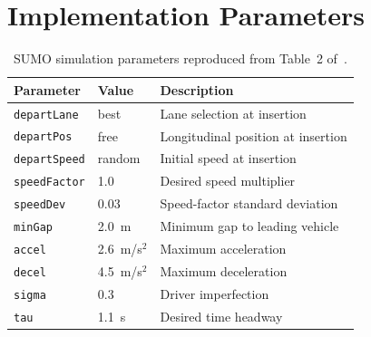 \documentclass{rescience}
\begin{document}




\hypersetup{linkcolor=black,urlcolor=darkgray}
\renewcommand\emph[1]{{\bfseries #1}}
\setlength\bibitemsep{0pt}
\printbibliography


\newpage
\appendix

\section{Implementation Parameters}
\label{sec:implementation_parameters}

\begin{table}[!h]
\centering
\caption{SUMO simulation parameters reproduced from Table~2 of~\cite{Yang2025Reinforcement}.}
\label{tab:sumo_params}
\begin{tabular}{lll}
\toprule
\textbf{Parameter} & \textbf{Value} & \textbf{Description} \\
\midrule
\texttt{departLane}  & best   & Lane selection at insertion \\
\texttt{departPos}   & free   & Longitudinal position at insertion \\
\texttt{departSpeed} & random & Initial speed at insertion \\
\texttt{speedFactor} & 1.0    & Desired speed multiplier \\
\texttt{speedDev}    & 0.03   & Speed-factor standard deviation \\
\texttt{minGap}      & 2.0~m  & Minimum gap to leading vehicle \\
\texttt{accel}       & 2.6~m/s$^2$ & Maximum acceleration \\
\texttt{decel}       & 4.5~m/s$^2$ & Maximum deceleration \\
\texttt{sigma}       & 0.3    & Driver imperfection \\
\texttt{tau}         & 1.1~s  & Desired time headway \\
\bottomrule
\end{tabular}
\end{table}
\end{document}
